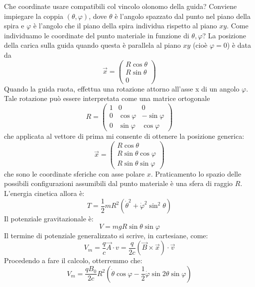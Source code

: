 \documentclass[a4paper,openany]{article}
\begin{document}
	Che coordinate usare compatibili col vincolo olonomo della guida? Conviene impiegare la coppia $(\theta,\varphi)$, dove $\theta$ è l'angolo spazzato dal punto nel piano della spira e $\varphi$ è l'angolo che il piano della spira individua rispetto al piano $xy$. Come individuamo le coordinate del punto materiale in funzione di $\theta, \varphi$? La posizione della carica sulla guida quando questa è parallela al piano $xy$ (cioè $\varphi = 0$) è data da
	\begin{equation}\label{key}
		\vec{x} = 
		\begin{pmatrix}
			R\cos\theta
			\\
			R\sin\theta
			\\0
		\end{pmatrix}
	\end{equation}
	Quando la guida ruota, effettua una rotazione attorno all'asse x di un angolo $\varphi$. Tale rotazione può essere interpretata come una matrice ortogonale
	\begin{equation}\label{key}
		R =
		\begin{pmatrix}
			1 & 0 & 0\\
			0 & \cos\varphi & -\sin\varphi \\
			0 & \sin\varphi & \cos\varphi
		\end{pmatrix}
	\end{equation}
	che applicata al vettore di prima mi consente di ottenere la posizione generica:
	\begin{equation}\label{key}
		\vec{x} = 
		\begin{pmatrix}
			R\cos\theta
			\\
			R\sin\theta\cos\varphi
			\\
			R\sin\theta\sin\varphi
		\end{pmatrix}
	\end{equation}
	che sono le coordinate sferiche con asse polare $x$. Praticamento lo spazio delle possibili configurazioni assumibili dal punto materiale è una sfera di raggio $R$. L'energia cinetica allora è:
	$$
	T = \dfrac{1}{2}mR^{2}(\dot{\theta}^{2}+\dot{\varphi}^{2}\sin^{2}\theta)
	$$
	Il potenziale gravitazionale è:
	$$
	V = mgR\sin\theta\sin\varphi
	$$
	Il termine di potenziale generalizzato si scrive, in cartesiane, come:
	$$
	V_m = \dfrac{q}{c}\vec{A}\cdot{v} = \dfrac{q}{2c}(\vec{B}\times\vec{x})\cdot\vec{v}
	$$
	Procedendo a fare il calcolo, otterremmo che:
	\begin{equation}\label{key}
		V_m = \dfrac{qB_0}{2c}R^2(\dot{\theta}\cos\varphi-\dfrac{1}{2}\dot{\varphi}\sin2\theta\sin\varphi)
	\end{equation}
\end{document}
